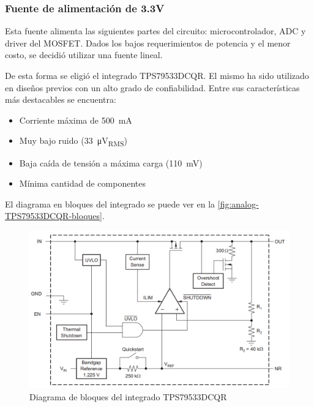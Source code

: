 \documentclass[../et.tex]{subfiles}
\begin{document}
  \subsubsection{Fuente de alimentación de 3.3V}
  Esta fuente alimenta las siguientes partes del circuito: microcontrolador, ADC y driver del MOSFET. Dados los bajos requerimientos de potencia y el menor costo, se decidió utilizar una fuente lineal.

  De esta forma se eligió el integrado TPS79533DCQR. El mismo ha sido utilizado en diseños previos con un alto grado de confiabilidad. Entre sus características más destacables se encuentra:

  \begin{itemize}
    \item Corriente máxima de \SI{500}{mA}
    \item Muy bajo ruido (\SI{33}{\micro V_{RMS}})
    \item Baja caída de tensión a máxima carga (\SI{110}{mV})
    \item Mínima cantidad de componentes
  \end{itemize}

  El diagrama en bloques del integrado se puede ver en la \autoref{fig:analog-TPS79533DCQR-bloques}.

  \begin{figure}[!htbp]
    \centering
    \includegraphics[scale=0.5]{../images/analog-TPS79533DCQR-bloques.png}
    \caption{Diagrama de bloques del integrado TPS79533DCQR}
    \label{fig:analog-TPS79533DCQR-bloques}
  \end{figure}
\end{document}
